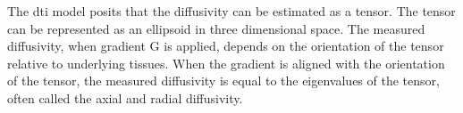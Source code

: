 \label{fig:dtiModle} The dti model posits that the diffusivity can be estimated as a tensor. The tensor can be represented as an ellipsoid in three dimensional space. The measured diffusivity, when gradient G is applied, depends on the orientation of the tensor relative to underlying tissues. When the gradient is aligned with the orientation of the tensor, the measured diffusivity is equal to the eigenvalues of the tensor, often called the axial and radial diffusivity.